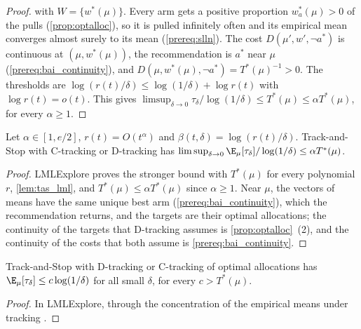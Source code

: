 \begin{proof}
  \leanok
   with $W = \{w^*(\mu)\}$. Every arm gets a positive proportion $w^*_a(\mu) > 0$
  of the pulls (\cref{prop:optalloc}), so it is pulled infinitely often and its empirical mean
  converges almost surely to its mean (\cref{prereq:slln}). The cost $D(\mu', w', \neg a^*)$ is
  continuous at $(\mu, w^*(\mu))$, the recommendation is $a^*$ near $\mu$
  (\cref{prereq:bai_continuity}), and $D(\mu, w^*(\mu), \neg a^*) = T^*(\mu)^{-1} > 0$. The
  thresholds are $\log(r(t)/\delta) \le \log(1/\delta) + \log r(t)$ with $\log r(t) = o(t)$.
  This gives $\limsup_{\delta \to 0} \tau_\delta / \log(1/\delta) \le T^*(\mu) \le \alpha
  T^*(\mu)$, for every $\alpha \ge 1$.
\end{proof}

\begin{theorem}[{\cite[Theorem 14]{GK16}}]
  \label{thm:expectation}
  \leanok
  Let $\alpha \in [1, e/2]$, $r(t) = O(t^\alpha)$ and $\beta(t, \delta) = \log(r(t)/\delta)$.
  Track-and-Stop with C-tracking or D-tracking has
  $\limsup_{\delta \to 0} \E_\mu[\tau_\delta] / \log(1/\delta) \le \alpha T^*(\mu)$.
\end{theorem}

\begin{proof}
  \leanok
  LMLExplore proves the stronger bound with $T^*(\mu)$ for every polynomial $r$,
  \cref{lem:tas_lml}, and $T^*(\mu) \le \alpha T^*(\mu)$ since $\alpha \ge 1$. Near $\mu$, the
  vectors of means have the same unique best arm (\cref{prereq:bai_continuity}), which the
  recommendation returns, and the targets are their optimal allocations; the continuity of the
  targets that D-tracking assumes is \cref{prop:optalloc}~(2), and the continuity of the costs
  that both assume is \cref{prereq:bai_continuity}.
\end{proof}

\begin{lemma}
  \label{lem:tas_lml}
  \leanok
  Track-and-Stop with D-tracking or C-tracking of optimal allocations has
  $\E_\mu[\tau_\delta] \le c \log(1/\delta)$ for all small $\delta$, for every $c > T^*(\mu)$.
\end{lemma}

\begin{proof}
  \leanok
  In LMLExplore, through the concentration of the empirical means under tracking
  \cite[Lemma 19]{GK16}.
\end{proof}
